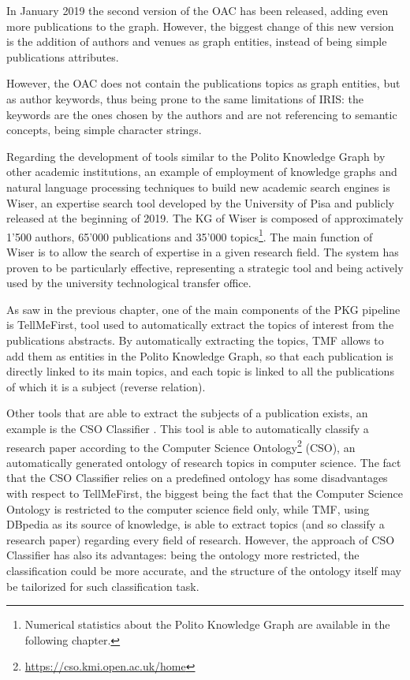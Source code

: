\documentclass[%
    corpo=13.5pt,
    twoside,
    oldstyle,
    tipotesi=magistrale,
    greek,
    evenboxes
]{toptesi}
\begin{document}
In January 2019 the second version of the OAC has been released, adding even
more publications to the graph. However, the biggest change of this new
version is the addition of authors and venues as graph entities,
instead of being simple publications attributes.

However, the OAC does not contain the publications topics as graph
entities, but as author keywords, thus being prone to the same limitations of
IRIS: the keywords are the ones chosen by the authors and are not
referencing to semantic concepts, being simple character strings.
\newline

Regarding the development of tools similar to the Polito Knowledge Graph
by other academic institutions, an example of employment of knowledge graphs
and natural language processing techniques to build new academic search engines
is Wiser\cite{cifariello2019}, an
expertise search tool developed by the University of Pisa and publicly released
at the beginning of 2019.
The KG of Wiser is composed of approximately 1'500 authors, 65'000 publications
and 35'000 topics\footnote{Numerical statistics about the Polito Knowledge Graph
are available in the following chapter.}.
The main function of Wiser is to allow the search of expertise in a given
research field.
The system has proven to be particularly effective, representing a strategic
tool and being actively used by the university technological transfer office.
\newline

As saw in the previous chapter, one of the main components of the PKG
pipeline is TellMeFirst, tool used to automatically extract the topics of
interest from the publications abstracts. By automatically extracting the
topics, TMF allows to add them as entities in the Polito Knowledge Graph,
so that each publication is directly linked to its main topics, and each topic
is linked to all the publications of which it is a subject (reverse relation).

Other tools that are able to extract the subjects of a publication exists, an
example is the CSO Classifier \cite{salatino2019}. This tool is able to
automatically classify a research paper according to the Computer Science
Ontology\footnote{\url{https://cso.kmi.open.ac.uk/home}} (CSO), an automatically
generated ontology of research topics in computer science.
The fact that the CSO Classifier relies on a predefined ontology has some
disadvantages with respect to TellMeFirst, the biggest being the fact that the
Computer Science Ontology is restricted to the computer science field only,
while TMF, using DBpedia as its source of knowledge, is able to extract
topics (and so classify a research paper) regarding every field of research.
However, the approach of CSO Classifier has also its advantages: being the
ontology more restricted, the classification could be more accurate, and the
structure of the ontology itself may be tailorized for such classification task.
\end{document}
